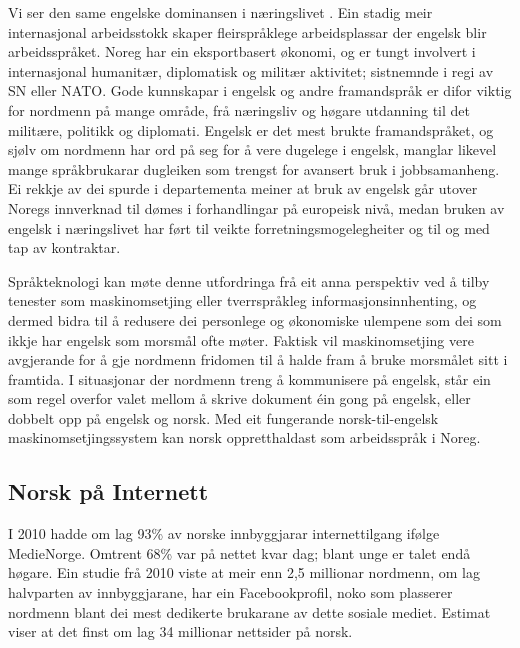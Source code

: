 \begin{multicols}{2}
Vi ser den same engelske dominansen i næringslivet \cite{SR:2010,Hel:2010}. 
Ein stadig meir internasjonal arbeidsstokk skaper fleirspråklege arbeidsplassar der engelsk blir arbeidsspråket. 
Noreg har ein eksportbasert økonomi, og er tungt involvert i internasjonal humanitær, diplomatisk og militær aktivitet; sistnemnde i regi av SN eller NATO. 
Gode kunnskapar i engelsk og andre framandspråk er difor viktig for nordmenn på mange område, frå næringsliv og høgare utdanning til det militære, politikk og diplomati. 
Engelsk er det mest brukte framandspråket, og sjølv om nordmenn har ord på seg for å vere dugelege i engelsk, manglar likevel mange språkbrukarar dugleiken som trengst for avansert bruk i jobbsamanheng. 
Ei rekkje av dei spurde i departementa meiner at bruk av engelsk går utover Noregs innverknad til dømes i forhandlingar på europeisk nivå, medan bruken av engelsk i næringslivet har ført til veikte forretningsmogelegheiter og til og med tap av kontraktar.


Språkteknologi kan møte denne utfordringa frå eit anna perspektiv ved å tilby tenester som maskinomsetjing eller tverrspråkleg informasjonsinnhenting, og dermed bidra til å redusere dei personlege og økonomiske ulempene som dei som ikkje har engelsk som morsmål ofte møter. 
Faktisk vil maskinomsetjing vere avgjerande for å gje nordmenn fridomen til å halde fram å bruke morsmålet sitt i framtida. 
I situasjonar der nordmenn treng å kommunisere på engelsk, står ein som regel overfor valet mellom å skrive dokument éin gong på engelsk, eller dobbelt opp på engelsk og norsk. 
Med eit fungerande norsk-til-engelsk maskinomsetjingssystem kan norsk oppretthaldast som arbeidsspråk i Noreg.

\subsection{Norsk på Internett}

I 2010 hadde om lag 93\% av norske innbyggjarar internettilgang ifølge MedieNorge. 
Omtrent 68\% var på nettet kvar dag; blant unge er talet endå høgare. 
Ein studie frå 2010 viste at meir enn 2,5 millionar nordmenn, om lag halvparten av innbyggjarane, har ein Facebookprofil, noko som plasserer nordmenn blant dei mest dedikerte brukarane av dette sosiale mediet. 
Estimat viser at det finst om lag 34 millionar nettsider på norsk. 


\end{multicols}
